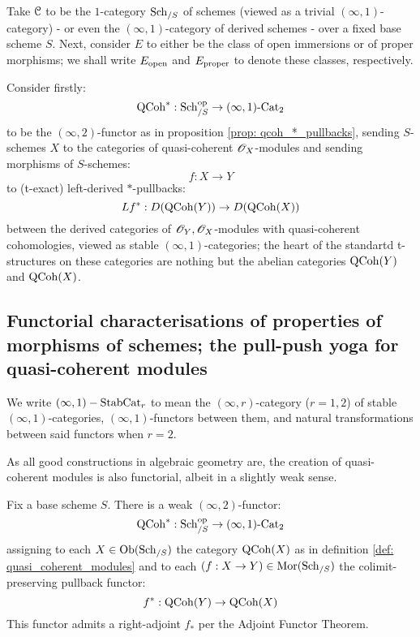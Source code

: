             \begin{example}
                Take $\mathcal{C}$ to be the $1$-category $\mathrm{Sch}_{/S}$ of schemes (viewed as a trivial $(\infty, 1)$-category) - or even the $(\infty, 1)$-category of derived schemes - over a fixed base scheme $S$. Next, consider $E$ to either be the class of open immersions or of proper morphisms; we shall write $E_{\mathrm{open}}$ and $E_{\mathrm{proper}}$ to denote these classes, respectively.

                Consider firstly:
                    $$\mathrm{QCoh}^*: \mathrm{Sch}_{/S}^{\mathrm{op}} \to (\infty, 1)\text{-}\mathrm{Cat}_2$$
                to be the $(\infty, 2)$-functor as in proposition \ref{prop: qcoh_*_pullbacks}, sending $S$-schemes $X$ to the categories of quasi-coherent $\mathscr{O}_X$-modules and sending morphisms of $S$-schemes:
                    $$f: X \to Y$$
                to (t-exact) left-derived $*$-pullbacks:
                    $$Lf^*: D(\mathrm{QCoh}(Y)) \to D(\mathrm{QCoh}(X))$$
                between the derived categories of $\mathscr{O}_Y, \mathscr{O}_X$-modules with quasi-coherent cohomologies, viewed as stable $(\infty, 1)$-categories; the heart of the standartd t-structures on these categories are nothing but the abelian categories $\mathrm{QCoh}(Y)$ and $\mathrm{QCoh}(X)$. 
            \end{example}

        \subsection{Functorial characterisations of properties of morphisms of schemes; the pull-push yoga for quasi-coherent modules}
            \begin{convention}
                We write $(\infty, 1)-\mathrm{Stab}\mathrm{Cat}_r$ to mean the $(\infty, r)$-category ($r = 1, 2$) of stable $(\infty, 1)$-categories, $(\infty, 1)$-functors between them, and natural transformations between said functors when $r = 2$.
            \end{convention}
        
            As all good constructions in algebraic geometry are, the creation of quasi-coherent modules is also functorial, albeit in a slightly weak sense. 
            \begin{proposition} \label{prop: qcoh_*_pullbacks}
                Fix a base scheme $S$. There is a weak $(\infty, 2)$-functor:
                    $$\mathrm{QCoh}^*: \mathrm{Sch}_{/S}^{\mathrm{op}} \to (\infty, 1)\text{-}\mathrm{Cat}_2$$
                assigning to each $X \in \mathrm{Ob}(\mathrm{Sch}_{/S})$ the category $\mathrm{QCoh}(X)$ as in definition \ref{def: quasi_coherent_modules} and to each $(f: X \to Y) \in \mathrm{Mor}(\mathrm{Sch}_{/S})$ the colimit-preserving pullback functor:
                    $$f^*: \mathrm{QCoh}(Y) \to \mathrm{QCoh}(X)$$
                This functor admits a right-adjoint $f_*$ per the Adjoint Functor Theorem. 
            \end{proposition}

